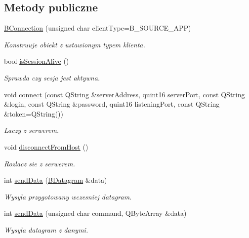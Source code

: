 \subsection*{Metody publiczne}
\begin{CompactItemize}
\item 
\hyperlink{class_b_connection_9b85170ee6ea831111b50a55d45ef8eb}{BConnection} (unsigned char clientType=B\_\-SOURCE\_\-APP)
\begin{CompactList}\small\item\em Konstruuje obiekt z ustawionym typem klienta. \item\end{CompactList}\item 
bool \hyperlink{class_b_connection_5a4985b2a3f559b448ce6660ba353acb}{isSessionAlive} ()
\begin{CompactList}\small\item\em Sprawda czy sesja jest aktywna. \item\end{CompactList}\item 
void \hyperlink{class_b_connection_ac501a13f453169ed00bc3d4f8664040}{connect} (const QString \&serverAddress, quint16 serverPort, const QString \&login, const QString \&password, quint16 listeningPort, const QString \&token=QString())
\begin{CompactList}\small\item\em Laczy z serwerem. \item\end{CompactList}\item 
void \hyperlink{class_b_connection_9035d3ca3836f1c841e0f91327753f14}{disconnectFromHost} ()
\begin{CompactList}\small\item\em Rozlacz sie z serwerem. \item\end{CompactList}\item 
int \hyperlink{class_b_connection_53b6835b9124709e108913103049910b}{sendData} (\hyperlink{class_b_datagram}{BDatagram} \&data)
\begin{CompactList}\small\item\em Wysyla przygotowany wczesniej datagram. \item\end{CompactList}\item 
int \hyperlink{class_b_connection_77f411c1ec683bd571f41023609f2e7f}{sendData} (unsigned char command, QByteArray \&data)
\begin{CompactList}\small\item\em Wysyla datagram z danymi. \item\end{CompactList}\item 

\end{CompactItemize}
